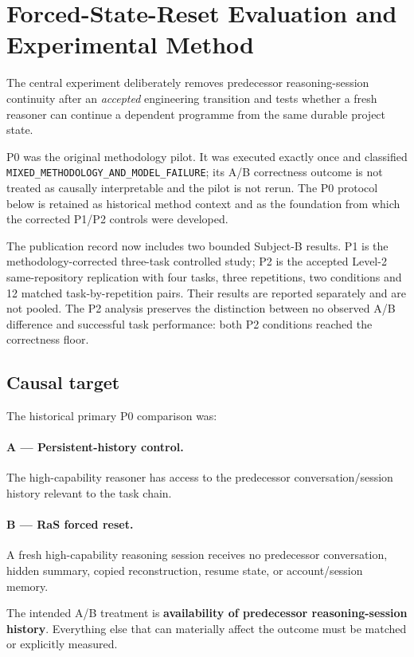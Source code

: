 \section{Forced-State-Reset Evaluation and Experimental Method}
\label{sec:method}

The central experiment deliberately removes predecessor reasoning-session continuity after an \emph{accepted} engineering transition and tests whether a fresh reasoner can continue a dependent programme from the same durable project state.

P0 was the original methodology pilot. It was executed exactly once and classified \texttt{MIXED\_METHODOLOGY\_AND\_MODEL\_FAILURE}; its A/B correctness outcome is not treated as causally interpretable and the pilot is not rerun. The P0 protocol below is retained as historical method context and as the foundation from which the corrected P1/P2 controls were developed.

The publication record now includes two bounded Subject-B results. P1 is the methodology-corrected three-task controlled study; P2 is the accepted Level-2 same-repository replication with four tasks, three repetitions, two conditions and 12 matched task-by-repetition pairs. Their results are reported separately and are not pooled. The P2 analysis preserves the distinction between no observed A/B difference and successful task performance: both P2 conditions reached the correctness floor.

\subsection{Causal target}

The historical primary P0 comparison was:

\paragraph{A --- Persistent-history control.}
The high-capability reasoner has access to the predecessor conversation/session history relevant to the task chain.

\paragraph{B --- RaS forced reset.}
A fresh high-capability reasoning session receives no predecessor conversation, hidden summary, copied reconstruction, resume state, or account/session memory.

The intended A/B treatment is \textbf{availability of predecessor reasoning-session history}. Everything else that can materially affect the outcome must be matched or explicitly measured.


